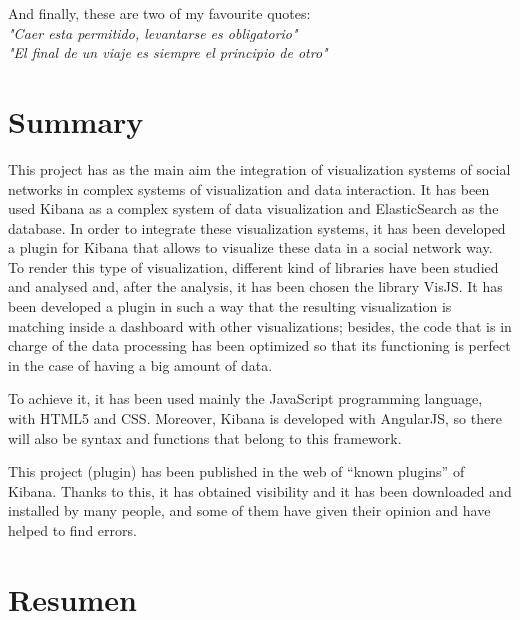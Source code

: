\documentclass[a4paper, 12pt]{book}
\begin{document}
And finally, these are two of my favourite quotes:\\ 

\textit{"Caer esta permitido, levantarse es obligatorio"}\\
\textit{"El final de un viaje es siempre el principio de otro"}



\chapter*{Summary}
This project has as the main aim the integration of visualization systems of social networks in complex systems of visualization and data interaction. It has been used Kibana as a complex system of data visualization and ElasticSearch as the database. In order to integrate these visualization systems, it has been developed a plugin for Kibana that allows to visualize these data in a social network way. To render this type of visualization, different kind of libraries have been studied and analysed and, after the analysis, it has been chosen the library VisJS. It has been developed a plugin in such a way that the resulting visualization is matching inside a dashboard with other visualizations; besides, the code that is in charge of the data processing has been optimized so that its functioning is perfect in the case of having a big amount of data.

To achieve it, it has been used mainly the JavaScript programming language, with HTML5 and CSS. Moreover, Kibana is developed with AngularJS, so there will also be syntax and functions that belong to this framework.

This project (plugin) has been published in the web of “known plugins” of Kibana. Thanks to this, it has obtained visibility and it has been downloaded and installed by many people, and some of them have given their opinion and have helped to find errors.


\chapter*{Resumen}
\end{document}
